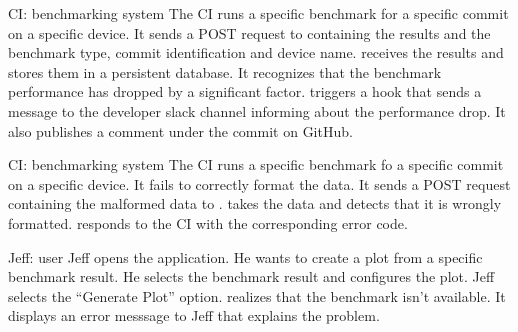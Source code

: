 {CI: \Gls{benchmarking system}}
{The CI runs a specific benchmark for a specific commit on a specific device. It sends a POST request to \parkview{} containing the results and the benchmark type, commit identification and device name. \parkview{} receives the results and stores them in a persistent database. It recognizes that the benchmark performance has dropped by a significant factor. \parkview{} triggers a hook that sends a message to the developer slack channel informing about the performance drop. It also publishes a comment under the commit on GitHub.}

{CI: \Gls{benchmarking system}}
{The CI runs a specific benchmark fo a specific commit on a specific device. It fails to correctly format the data. It sends a POST request containing the malformed data to \parkview{}. \parkview{} takes the data and detects that it is wrongly formatted. \parkview{} responds to the CI with the corresponding error code.}

{Jeff: \Gls{user}}
{Jeff opens the application. He wants to create a \gls{plot} from a specific benchmark result. He selects the benchmark result and configures the \gls{plot}. Jeff selects the \enquote{Generate Plot} option. \parkview{} realizes that the benchmark isn't available. It displays an error messsage to Jeff that explains the problem.}
